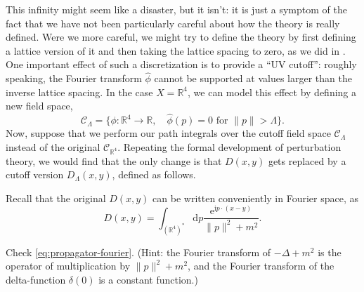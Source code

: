 \documentclass[12pt,letterpaper,reqno]{article}
\numberwithin{equation}{section}
\newcommand{\cC}{\ensuremath{\mathcal C}}
\newcommand{\R}{\ensuremath{\mathbb R}}
\newcommand{\I}{{\mathrm i}}
\newcommand{\e}{{\mathrm e}}
\newcommand{\de}{\mathrm{d}}
\newcommand{\norm}[1]{\lVert#1\rVert}
\newcommand{\fixme}[1]{{\color{orange}{[#1]}}}
\begin{document}
This infinity might seem like a disaster, but it isn't: it is just a
symptom of the 
fact that we have not been particularly careful about how the theory is really defined.
Were we more careful, we might 
try to define the theory by first defining a lattice version of
it and then taking the lattice spacing to zero, as 
we did in \fixme{...}. One important effect of such a discretization is
to provide a ``UV cutoff'': roughly speaking,
the Fourier transform $\hat\phi$ cannot be supported at values
larger than the inverse lattice spacing.
In the case $X = \R^4$, 
we can model this effect by defining a new field space,
\begin{equation}
  \cC_\Lambda = \{ \phi: \R^4 \to \R, \quad \hat\phi(p) = 0 \text{ for } \norm{p} > \Lambda\}.
\end{equation}
Now, suppose that we perform our path integrals over the cutoff
field space $\cC_\Lambda$
instead of the original $\cC_{\R^4}$.
Repeating the formal development of perturbation theory, we would find that the
only change \fixme{check} is that $D(x,y)$ gets replaced by a cutoff version
$D_\Lambda(x,y)$,
defined as follows.

Recall that the original $D(x,y)$ can be written conveniently in Fourier
space, as \fixme{factors of $2\pi$?}
\begin{equation} \label{eq:propagator-fourier}
  D(x,y) = \int_{(\R^4)^*} \de p \frac{\e^{\I p \cdot (x-y)}}{\norm{p}^2 + m^2}.
\end{equation}

\begin{exercise} Check \eqref{eq:propagator-fourier}. (Hint: the
Fourier transform of $-\Delta + m^2$ is the operator of multiplication
by $\norm{p}^2 + m^2$, and the Fourier transform of the delta-function 
$\delta(0)$ is a constant function.)
\end{exercise}
\end{document}
